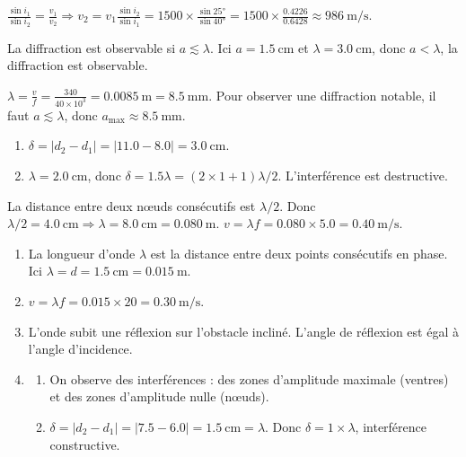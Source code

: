 $\frac{\sin i_1}{\sin i_2} = \frac{v_1}{v_2} \Rightarrow v_2 = v_1 \frac{\sin i_2}{\sin i_1} = 1500 \times \frac{\sin\ang{25}}{\sin\ang{40}} = 1500 \times \frac{0.4226}{0.6428} \approx \SI{986}{\metre\per\second}$.

La diffraction est observable si $a \lesssim \lambda$. Ici $a = \SI{1.5}{\centi\metre}$ et $\lambda = \SI{3.0}{\centi\metre}$, donc $a < \lambda$, la diffraction est observable.

$\lambda = \frac{v}{f} = \frac{340}{40\times 10^3} = \SI{0.0085}{\metre} = \SI{8.5}{\milli\metre}$.
Pour observer une diffraction notable, il faut $a \lesssim \lambda$, donc $a_{\max} \approx \SI{8.5}{\milli\metre}$.

\begin{enumerate}
    \item $\delta = |d_2 - d_1| = |11.0 - 8.0| = \SI{3.0}{\centi\metre}$.
    \item $\lambda = \SI{2.0}{\centi\metre}$, donc $\delta = 1.5\lambda = (2 \times 1 + 1)\lambda/2$. L'interférence est destructive.
\end{enumerate}

La distance entre deux nœuds consécutifs est $\lambda/2$. Donc $\lambda/2 = \SI{4.0}{\centi\metre} \Rightarrow \lambda = \SI{8.0}{\centi\metre} = \SI{0.080}{\metre}$.
$v = \lambda f = 0.080 \times 5.0 = \SI{0.40}{\metre\per\second}$.

\begin{enumerate}
    \item La longueur d'onde $\lambda$ est la distance entre deux points consécutifs en phase. Ici $\lambda = d = \SI{1.5}{\centi\metre} = \SI{0.015}{\metre}$.
    \item $v = \lambda f = 0.015 \times 20 = \SI{0.30}{\metre\per\second}$.
    \item L'onde subit une réflexion sur l'obstacle incliné. L'angle de réflexion est égal à l'angle d'incidence.
    \item 
    \begin{enumerate}
        \item On observe des interférences : des zones d'amplitude maximale (ventres) et des zones d'amplitude nulle (nœuds).
        \item $\delta = |d_2 - d_1| = |7.5 - 6.0| = \SI{1.5}{\centi\metre} = \lambda$. Donc $\delta = 1 \times \lambda$, interférence constructive.
    \end{enumerate}
\end{enumerate}

